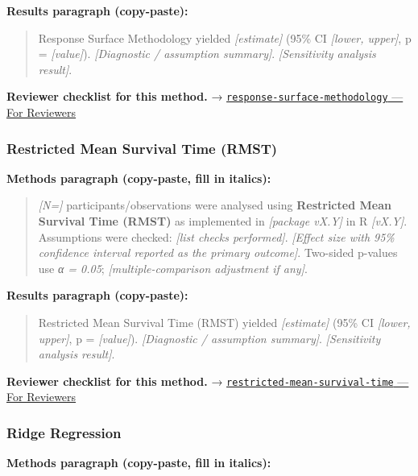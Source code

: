\documentclass[
]{article}
\begin{document}
\textbf{Results paragraph (copy-paste):}

\begin{quote}
Response Surface Methodology yielded \emph{{[}estimate{]}} (95\% CI
\emph{{[}lower, upper{]}}, p = \emph{{[}value{]}}). \emph{{[}Diagnostic
/ assumption summary{]}}. \emph{{[}Sensitivity analysis result{]}}.
\end{quote}

\textbf{Reviewer checklist for this method.} →
\href{../chapters/16-design/response-surface-methodology.Rmd\#for-reviewers}{\texttt{response-surface-methodology}
--- For Reviewers}

\subsubsection{Restricted Mean Survival Time
(RMST)}\label{restricted-mean-survival-time-rmst}

\textbf{Methods paragraph (copy-paste, fill in italics):}

\begin{quote}
\emph{{[}N={]}} participants/observations were analysed using
\textbf{Restricted Mean Survival Time (RMST)} as implemented in
\emph{{[}package vX.Y{]}} in R \emph{{[}vX.Y{]}}. Assumptions were
checked: \emph{{[}list checks performed{]}}. \emph{{[}Effect size with
95\% confidence interval reported as the primary outcome{]}}. Two-sided
p-values use \emph{α = 0.05}; \emph{{[}multiple-comparison adjustment if
any{]}}.
\end{quote}

\textbf{Results paragraph (copy-paste):}

\begin{quote}
Restricted Mean Survival Time (RMST) yielded \emph{{[}estimate{]}} (95\%
CI \emph{{[}lower, upper{]}}, p = \emph{{[}value{]}}).
\emph{{[}Diagnostic / assumption summary{]}}. \emph{{[}Sensitivity
analysis result{]}}.
\end{quote}

\textbf{Reviewer checklist for this method.} →
\href{../chapters/11-survival/restricted-mean-survival-time.Rmd\#for-reviewers}{\texttt{restricted-mean-survival-time}
--- For Reviewers}

\subsubsection{Ridge Regression}\label{ridge-regression}

\textbf{Methods paragraph (copy-paste, fill in italics):}
\end{document}
